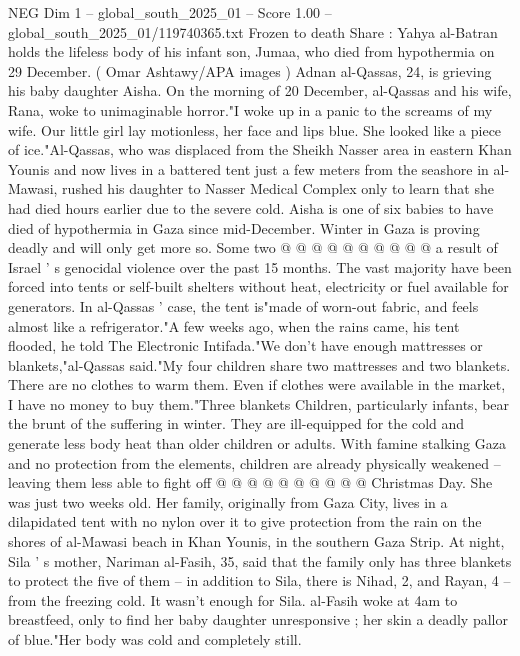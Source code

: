 \begin{textsample}{NEG Dim 1 – global\_south\_2025\_01 – Score 1.00 – global\_south\_2025\_01/119740365.txt}  \label{ex:f1_neg_155}
Frozen to death Share : Yahya al-Batran holds the lifeless body of his infant son, Jumaa, who died from hypothermia on 29 December. ( Omar Ashtawy/APA images ) Adnan al-Qassas, 24, is grieving his baby daughter Aisha.
On the morning of 20 December, al-Qassas and his wife, Rana, woke to unimaginable horror."I woke up in a panic to the screams of my wife.
Our little girl lay motionless, her face and lips blue.
She looked like a piece of ice."Al-Qassas, who was displaced from the Sheikh Nasser area in eastern Khan Younis and now lives in a battered tent just a few meters from the seashore in al-Mawasi, rushed his daughter to Nasser Medical Complex only to learn that she had died hours earlier due to the severe cold.
Aisha is one of six babies to have died of hypothermia in Gaza since mid-December.
Winter in Gaza is proving deadly and will only get more so.
Some two @ @ @ @ @ @ @ @ @ @ a result of Israel ' s genocidal violence over the past 15 months.
The vast majority have been forced into tents or self-built shelters without heat, electricity or fuel available for generators.
In al-Qassas ' case, the tent is"made of worn-out fabric, and feels almost like a refrigerator."A few weeks ago, when the rains came, his tent flooded, he told The Electronic Intifada."We don't have enough mattresses or blankets,"al-Qassas said."My four children share two mattresses and two blankets.
There are no clothes to warm them.
Even if clothes were available in the market, I have no money to buy them."Three blankets Children, particularly infants, bear the brunt of the suffering in winter.
They are ill-equipped for the cold and generate less body heat than older children or adults.
With famine stalking Gaza and no protection from the elements, children are already physically weakened -- leaving them less able to fight off @ @ @ @ @ @ @ @ @ @ Christmas Day.
She was just two weeks old.
Her family, originally from Gaza City, lives in a dilapidated tent with no nylon over it to give protection from the rain on the shores of al-Mawasi beach in Khan Younis, in the southern Gaza Strip.
At night, Sila ' s mother, Nariman al-Fasih, 35, said that the family only has three blankets to protect the five of them -- in addition to Sila, there is Nihad, 2, and Rayan, 4 -- from the freezing cold.
It wasn't enough for Sila. al-Fasih woke at 4am to breastfeed, only to find her baby daughter unresponsive ; her skin a deadly pallor of blue."Her body was cold and completely still.

\end{textsample}
